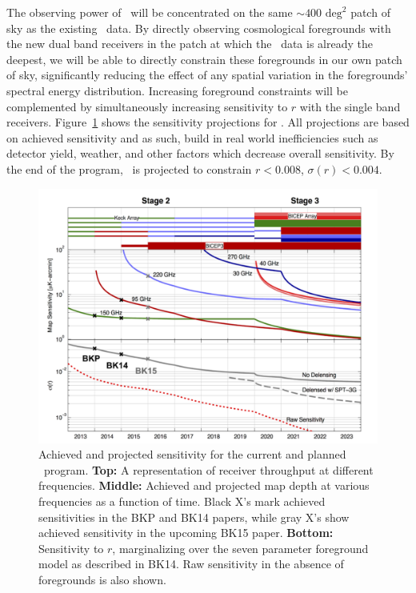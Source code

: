 \documentclass[]{spie}  %
\begin{document}
The observing power of \biceparray\ will be concentrated on the same $\sim400
\text{ deg}^2$ patch of sky as the existing \bk\ data. By directly
observing cosmological foregrounds with the new dual band receivers in the
patch at which the \bk\ data is already the deepest, we will be able to
directly constrain these foregrounds in our own patch of sky, significantly
reducing the effect of any spatial variation in the foregrounds' spectral
energy distribution. Increasing foreground constraints will be complemented by
simultaneously increasing sensitivity to $r$ with the single band receivers. Figure~\ref{fig:projections} shows the sensitivity projections for \biceparray. All projections are based on achieved sensitivity and as such, build in real world inefficiencies such as detector yield, weather, and other factors which decrease overall sensitivity. By the end of the program, \biceparray\ is projected to constrain $r<0.008$, $\sigma (r)<0.004$.


\begin{figure}[hb]
\center
\includegraphics[scale=0.4]{projections.pdf}
\caption{Achieved and projected sensitivity for the current and planned \bk\ program. \textbf{Top:} A representation of receiver throughput at different frequencies. \textbf{Middle:} Achieved and projected map depth at various frequencies as a function of time. Black X's mark achieved sensitivities in the BKP\cite{bkp} and BK14\cite{bk14} papers, while gray X's show achieved sensitivity in the upcoming BK15 paper. \textbf{Bottom:} Sensitivity to $r$, marginalizing over the seven parameter foreground model as described in BK14. Raw sensitivity in the absence of foregrounds is also shown.}
\label{fig:projections}
\end{figure}









\end{document}
